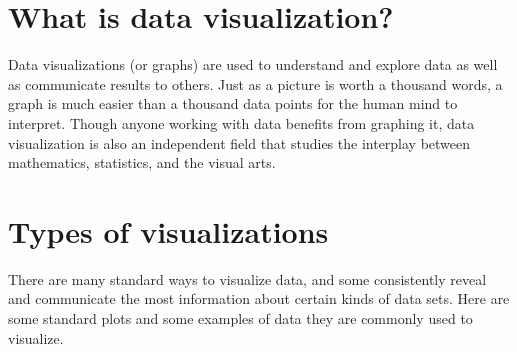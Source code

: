 \label{lab:DataVis}

\section*{What is data visualization?} 
Data visualizations (or graphs) are used to understand and explore data as well as communicate results to others. 
Just as a picture is worth a thousand words, a graph is much easier than a thousand data points for the human mind to interpret. 
Though anyone working with data benefits from graphing it, data visualization is also an independent field that studies the interplay between mathematics, statistics, and the visual arts.

\section*{Types of visualizations}
There are many standard ways to visualize data, and some consistently reveal and communicate the most information about certain kinds of data sets. 
Here are some standard plots and some examples of data they are commonly used to visualize.

